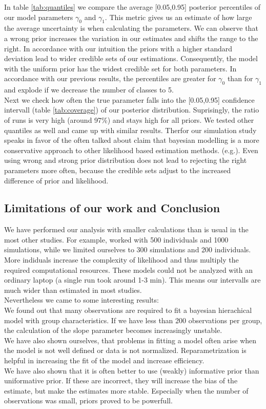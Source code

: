 In table  \ref{tab:quantiles} we compare the average [0.05,0.95] posterior percentiles of our model parameters $\gamma_0$ and $\gamma_1$. 
This metric gives us an estimate of how large the average uncertainty is when calculating the parameters. We can observe that a wrong prior increases the variation in our estimates and shifts the range to the right. 
In accordance with our intuition the priors with a higher standard deviation lead to wider credible sets of our estimations. Consequently, the model with the uniform prior has the widest credible set for both parameters. In accordance with our previous results, the percentiles are greater for $\gamma_0$ than for $\gamma_1$ and explode if we decrease the number of classes to 5.\\
Next we check how often the true parameter falls into the [0.05,0.95] confidence intervall (table \ref{tab:coverage}) of our posterior distribution. Suprisingly, the ratio of runs is very high (around 97\%) and stays high for all priors.
We tested other quantiles as well and came up with similar results. Therfor our simulation study speaks in favor of the often talked about claim that bayesian modelling is a more conservative approach to other likelihood based estimation methods.  (e.g.\cite{stegmueller2013}). Even using wrong and strong prior distribution does not lead to rejecting the right parameters more often, because the credible sets adjust to the increased difference of prior and likelihood.


\subsection{Limitations of our work and Conclusion}


We have performed our analysis with smaller calculations than is usual in the most other studies. 
For example, \cite{stegmueller2013} worked with 500 individuals and 1000 simulations, while we limited ourselves to 300 simulations and 200 individuals. More indiduals increase the complexity of likelihood and thus multiply the required computational resources. These models could not be analyzed with an ordinary laptop (a single run took around 1-3 min). This means our intervalls are much wider than estimated in most studies.\\
Nevertheless we came to some interesting results: \\
We found out that many observations are required to fit a bayesian hierachical model with group characteristics. If we have less than 200 observations per group, the calculation of the slope parameter becomes increasingly unstable.  \\
We have also shown ourselves, that problems in fitting a model often arise when the model is not well defined or data is not normalized. Reparametrization is helpful in increasing the fit of the model and  increase efficiency.\\
We have also shown that it is often better to use (weakly) informative prior than uniformative prior. If these are incorrect, they will increase the bias of the estimate, but make the estimates more stable. Especially when the number of observations was small, priors proved to be powerfull.\\


